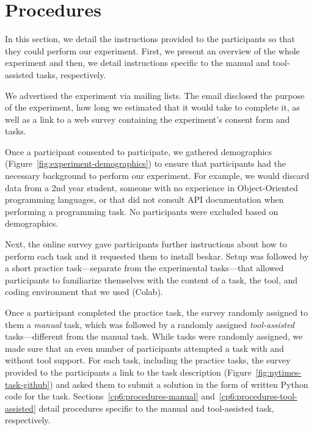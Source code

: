 
\section{Procedures}
\label{cp6:procedures}





In this section, we detail the instructions provided to the participants so that 
they could perform our experiment. 
First, we present an overview of the whole experiment and then, we detail
instructions specific to the manual and tool-assisted tasks, respectively.



We advertised the experiment via mailing lists. The email disclosed the purpose of the experiment, how long we estimated that it would take to complete it, as well as a link 
to a web survey containing the experiment's consent form and tasks. 




Once a participant consented to participate, we gathered demographics (Figure~\ref{fig:experiment-demographics}) to ensure that participants had the necessary background to perform our experiment. For example, we would discard data from a 2nd year student, someone with no experience in Object-Oriented programming languages, or that did not consult API documentation when performing a programming task. No participants were excluded based on demographics.





Next, the online survey gave participants further instructions 
about how to perform each task and it requested them to install \acs{beskar}.
Setup was followed by a short practice task---separate from the experimental tasks---that allowed participants to familiarize themselves with the content of a task, the tool, and coding environment that we used (Colab). 



Once a participant completed the practice task, the survey randomly assigned to them a \textit{manual} task, which was followed by a randomly assigned \textit{tool-assisted} tasks---different from the manual task. While tasks were randomly assigned, we made sure that an even number of participants attempted a task with and without tool support.
For each task, including the practice tasks, the survey provided to the participants a link 
to the task description (Figure~\ref{fig:nytimes-task-github}) and asked them to submit a solution in the form of written Python code for the task. Sections~\ref{cp6:procedures-manual} and~\ref{cp6:procedures-tool-assisted}
detail procedures specific to the manual and tool-assisted task, respectively.



